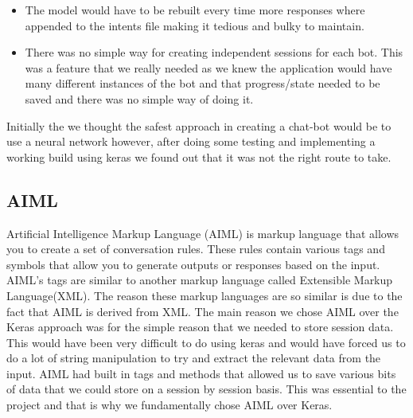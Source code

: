 \begin{itemize}
  \item The model would have to be rebuilt every time more responses where appended to the intents file making it tedious and bulky to maintain.
  \item There was no simple way for creating independent sessions for each bot. This was a feature that we really needed as we knew the application would have many different instances of the bot and that progress/state needed to be saved and there was no simple way of doing it.
\end{itemize}

Initially the we thought the safest approach in creating a chat-bot would be to use a neural network however, after doing some testing and implementing a working build using keras we found out that it was not the right route to take.

\subsection{AIML}
%
Artificial Intelligence Markup Language (AIML) is markup language that allows you to create a set of conversation rules\cite{AIChatBo91:online}. These rules contain various tags and symbols that allow you to generate outputs or responses based on the input. AIML's tags are similar to another markup language called Extensible Markup Language(XML). The reason these markup languages are so similar is due to the fact that AIML is derived from XML. The main reason we chose AIML over the Keras approach was for the simple reason that we needed to store session data. This would have been very difficult to do using keras and would have forced us to do a lot of string manipulation to try and extract the relevant data from the input. AIML had built in tags and methods that allowed us to save various bits of data that we could store on a session by session basis. This was essential to the project and that is why we fundamentally chose AIML over Keras.
\newline

